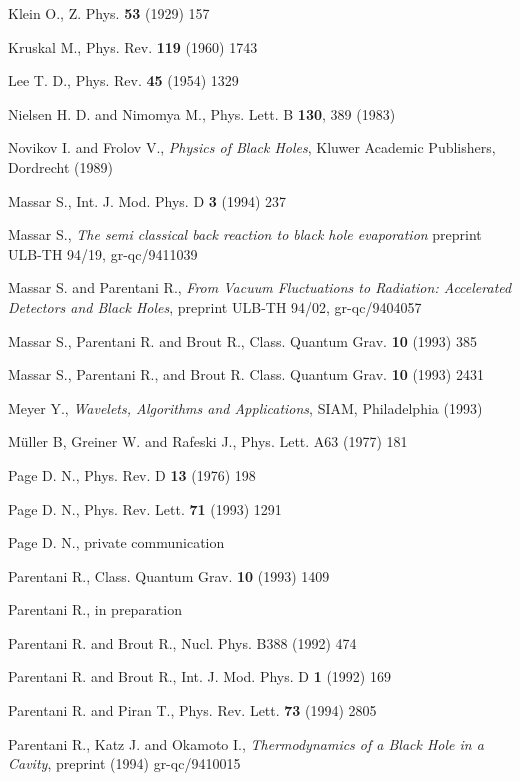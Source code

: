\documentclass[12pt,oneside]{report}
\begin{document}
\begin{thebibliography}{999}
 Klein O., Z. Phys. {\bf 53} (1929) 157

Kruskal M., Phys. Rev. {\bf 119 }(1960) 1743

Lee T. D., Phys. Rev. {\bf  45} (1954) 1329

Nielsen H. D. and Nimomya M., Phys. Lett. 
B {\bf 130}, 389 (1983)


Novikov I. and Frolov V., {\em Physics of Black Holes}, Kluwer
Academic Publishers, Dordrecht (1989)

 Massar S., Int. J. Mod. Phys. D {\bf 3} (1994) 237

  Massar S., {\em The semi classical back reaction to black
hole evaporation} preprint ULB-TH 94/19, gr-qc/9411039

Massar S. and Parentani R., {\em From Vacuum Fluctuations to
Radiation: Accelerated Detectors and Black Holes}, preprint ULB-TH 94/02, gr-qc/9404057

Massar S., Parentani R. and Brout R., Class. Quantum Grav.
{\bf 10} (1993) 385

 Massar S., Parentani R., and Brout R. Class. Quantum Grav.
{\bf 10} (1993) 2431

Meyer Y., {\em Wavelets, Algorithms and Applications}, SIAM,
Philadelphia (1993)

M\"uller B, Greiner W. and Rafeski J., Phys. Lett. A63
(1977) 181 



 Page D. N., Phys. Rev. D {\bf 13} (1976) 198

 Page D. N., Phys. Rev. Lett. {\bf 71}  (1993) 1291 

 Page D. N., private communication

Parentani R., Class. Quantum Grav. {\bf 10} (1993) 1409

Parentani R., in preparation

Parentani R. and Brout R., Nucl. Phys. B388 (1992) 474


Parentani R. and Brout R., Int. J. Mod.
Phys. D {\bf 1 }(1992) 169

 Parentani R. and Piran T.,  Phys. Rev. Lett. {\bf 73} (1994) 2805 

 Parentani R., Katz J. and Okamoto I., 
{\em Thermodynamics of a Black Hole in a Cavity}, preprint (1994) gr-qc/9410015


\end{thebibliography}
\end{document}
